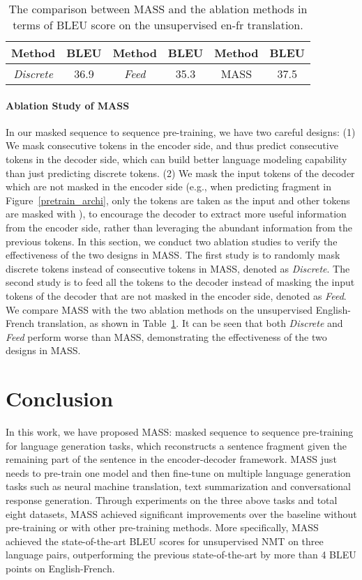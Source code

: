 \documentclass{article}
\begin{document}
	\begin{table}[!t]
		\small
		\centering
		\begin{tabular}{cc |cc|cc}
			\toprule
			Method & BLEU & Method & BLEU & Method & BLEU \\
			\midrule
			\textit{Discrete} & 36.9 & \textit{Feed} & 35.3 & MASS & 37.5  \\
			\bottomrule
		\end{tabular}
		\caption{The comparison between MASS and the ablation methods in terms of BLEU score on the unsupervised en-fr translation.}
		\label{tab_ablation}
	\end{table}
	
	\paragraph{Ablation Study of MASS}
	In our masked sequence to sequence pre-training, we have two careful designs: (1) We mask consecutive tokens in the encoder side, and thus predict consecutive tokens in the decoder side, which can build better language modeling capability than just predicting discrete tokens. (2) We mask the input tokens of the decoder which are not masked in the encoder side (e.g., when predicting fragment  in Figure~\ref{pretrain_archi}, only the tokens  are taken as the input and other tokens are masked with ), to encourage the decoder to extract more useful information from the encoder side, rather than leveraging the abundant information from the previous tokens. In this section, we conduct two ablation studies to verify the effectiveness of the two designs in MASS. The first study is to randomly mask discrete tokens instead of consecutive tokens in MASS, denoted as \textit{Discrete}. The second study is to feed all the tokens to the decoder instead of masking the input tokens of the decoder that are not masked in the encoder side, denoted as \textit{Feed}. We compare MASS with the two ablation methods on the unsupervised English-French translation, as shown in Table~\ref{tab_ablation}. It can be seen that both \textit{Discrete} and \textit{Feed} perform worse than MASS, demonstrating the effectiveness of the two designs in MASS.
	
	\section{Conclusion}
	In this work, we have proposed MASS: masked sequence to sequence pre-training for language generation tasks, which reconstructs a sentence fragment given the remaining part of the sentence in the encoder-decoder framework. MASS just needs to pre-train one model and then fine-tune on multiple language generation tasks such as neural machine translation, text summarization and conversational response generation. Through experiments on the three above tasks and total eight datasets, MASS achieved significant improvements over the baseline without pre-training or with other pre-training methods. More specifically, MASS achieved the state-of-the-art BLEU scores for unsupervised NMT on three language pairs, outperforming the previous state-of-the-art by more than 4 BLEU points on English-French.
	
\end{document}
